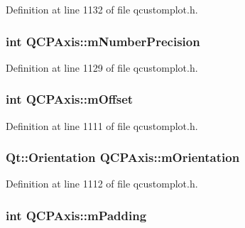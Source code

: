 Definition at line 1132 of file qcustomplot.\-h.

\hypertarget{class_q_c_p_axis_acd76e8c783384d99ccc4a13797eec188}{
\subsubsection[{m\-Number\-Precision}]{\setlength{\rightskip}{0pt plus 5cm}int Q\-C\-P\-Axis\-::m\-Number\-Precision\hspace{0.3cm}{\ttfamily [protected]}}}\label{class_q_c_p_axis_acd76e8c783384d99ccc4a13797eec188}


Definition at line 1129 of file qcustomplot.\-h.

\hypertarget{class_q_c_p_axis_a341426d76574ed800cb82582f32578bf}{
\subsubsection[{m\-Offset}]{\setlength{\rightskip}{0pt plus 5cm}int Q\-C\-P\-Axis\-::m\-Offset\hspace{0.3cm}{\ttfamily [protected]}}}\label{class_q_c_p_axis_a341426d76574ed800cb82582f32578bf}


Definition at line 1111 of file qcustomplot.\-h.

\hypertarget{class_q_c_p_axis_a048e1792fa86f4f86df55200b3f0be36}{
\subsubsection[{m\-Orientation}]{\setlength{\rightskip}{0pt plus 5cm}Qt\-::\-Orientation Q\-C\-P\-Axis\-::m\-Orientation\hspace{0.3cm}{\ttfamily [protected]}}}\label{class_q_c_p_axis_a048e1792fa86f4f86df55200b3f0be36}


Definition at line 1112 of file qcustomplot.\-h.

\hypertarget{class_q_c_p_axis_a52a805a4f03231210e0880db7f77e098}{
\subsubsection[{m\-Padding}]{\setlength{\rightskip}{0pt plus 5cm}int Q\-C\-P\-Axis\-::m\-Padding\hspace{0.3cm}{\ttfamily [protected]}}}\label{class_q_c_p_axis_a52a805a4f03231210e0880db7f77e098}



